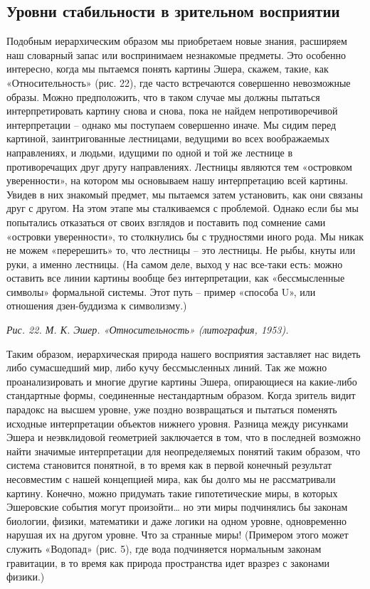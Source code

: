 \documentclass[../main.tex]{subfiles}
\begin{document}
\subsection{Уровни стабильности в зрительном восприятии}

Подобным иерархическим образом мы приобретаем новые знания, расширяем наш словарный запас или воспринимаем незнакомые предметы. Это особенно интересно, когда мы пытаемся понять картины Эшера, скажем, такие, как «Относительность» (рис. 22), где часто встречаются совершенно невозможные образы. Можно предположить, что в таком случае мы должны пытаться интерпретировать картину снова и снова, пока не найдем непротиворечивой интерпретации \--- однако мы поступаем совершенно иначе. Мы сидим перед картиной, заинтригованные лестницами, ведущими во всех воображаемых направлениях, и людьми, идущими по одной и той же лестнице в противоречащих друг другу направлениях. Лестницы являются тем «островком уверенности», на котором мы основываем нашу интерпретацию всей картины. Увидев в них знакомый предмет, мы пытаемся затем установить, как они связаны друг с другом. На этом этапе мы сталкиваемся с проблемой. Однако если бы мы попытались отказаться от своих взглядов и поставить под сомнение сами «островки уверенности», то столкнулись бы с трудностями иного рода. Мы никак не можем «перерешить» то, что лестницы \--- это лестницы. Не рыбы, кнуты или руки, а именно лестницы. (На самом деле, выход у нас все-таки есть: можно оставить все линии картины вообще без интерпретации, как «бессмысленные символы» формальной системы. Этот путь \--- пример «способа U», или отношения дзен-буддизма к символизму.)

\emph{Рис. 22. М. К. Эшер. «Относительность» (литография, 1953).}

Таким образом, иерархическая природа нашего восприятия заставляет нас видеть либо сумасшедший мир, либо кучу бессмысленных линий. Так же можно проанализировать и многие другие картины Эшера, опирающиеся на какие-либо стандартные формы, соединенные нестандартным образом. Когда зритель видит парадокс на высшем уровне, уже поздно возвращаться и пытаться поменять исходные интерпретации объектов нижнего уровня. Разница между рисунками Эшера и неэвклидовой геометрией заключается в том, что в последней возможно найти значимые интерпретации для неопределяемых понятий таким образом, что система становится понятной, в то время как в первой конечный результат несовместим с нашей концепцией мира, как бы долго мы не рассматривали картину. Конечно, можно придумать такие гипотетические миры, в которых Эшеровские события могут произойти\ldots{} но эти миры подчинялись бы законам биологии, физики, математики и даже логики на одном уровне, одновременно нарушая их на другом уровне. Что за странные миры! (Примером этого может служить «Водопад» (рис. 5), где вода подчиняется нормальным законам гравитации, в то время как природа пространства идет вразрез с законами физики.)
\end{document}
